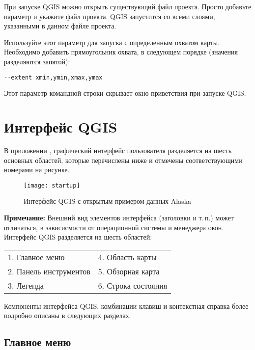 При запуске QGIS можно открыть существующий файл проекта. Просто
добавьте параметр  и укажите файл проекта. QGIS
запустится со всеми слоями, указанными в данном файле проекта.

Используйте этот параметр для запуска с определенным охватом карты.
Необходимо добавить прямоугольник охвата, в следующем порядке (значения
разделяются запятой):
\begin{verbatim}
--extent xmin,ymin,xmax,ymax
\end{verbatim}

Этот параметр командной строки скрывает окно приветствия при запуске QGIS.

\section{Интерфейс QGIS}
\label{label_qgismainwindow}

В приложении \qg, графический интерфейс пользователя разделяется на шесть основных
областей, которые перечислены ниже и отмечены соответствующими номерами на рисунке.

\begin{figure}[ht]
   \centering
    \texttt{[image: startup]}
    \caption{Интерфейс QGIS с открытым примером данных Alaska \wincaption} \label{fig:startup}
\end{figure}

\textbf{Примечание:} Внешний вид элементов интерфейса (заголовки
и т.\,п.) может отличаться, в зависисмости от операционной системы и
менеджера окон.\\

Интерфейс QGIS разделяется на шесть областей:

\begin{tabular}{p{5cm} p{5cm}}
1. Главное меню & 4. Область карты \\
2. Панель инструментов & 5. Обзорная карта \\
3. Легенда & 6. Строка состояния \\
\end{tabular}

Компоненты интерфейса QGIS, комбинации клавиш и контекстная справка более
подробно описаны в следующих разделах.

\subsection{Главное меню}\label{label_menubar}

